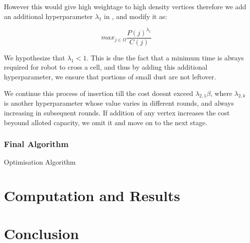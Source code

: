 \documentclass{article}
\begin{document}
However this would give high weightage to high density vertices therefore we add an additional hyperparameter $\lambda_1$ in ,
and modify it as:

\begin{equation} \label{eq4}
    max_{j \in \Omega}  \frac{P(j)^{\lambda_{1}}}{C(j)} 
\end{equation}

We hypothesize that $\lambda_{1} < 1$. This is due the fact that a minimum time is always required for robot to cross a cell, and thus by adding this additional hyperparameter,
we ensure that portions of small dust are not leftover.

We continue this process of insertion till the cost doesnt exceed $\lambda_{2,1} \beta$, where $\lambda_{2,k}$ is another hyperparameter whose value varies in different rounds, and always increasing in subsequent rounds. 
If addition of any vertex increases the cost beyound alloted capacity, we omit it and move on to the next stage.








\subsubsection{Final Algorithm}

\begin{algorithm}[H]
    \SetAlgoLined
\caption{Optimisation Algorithm}
\end{algorithm}

\section{Computation and Results}



\section{Conclusion}




\end{document}
